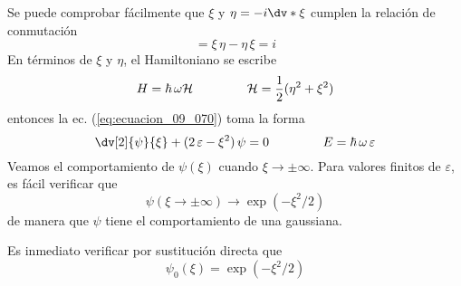 Se puede comprobar fácilmente que $\xi$ y $\eta = - i \dv*{\xi}$ cumplen la relación de conmutación
\begin{equation}
[\xi, \eta] = \xi \, \eta - \eta \, \xi = i
\label{eq:ecuacion_09_072}
\end{equation}
En términos de  $\xi$ y $\eta$, el Hamiltoniano se escribe
\begin{equation}
H =  \hbar \, \omega \mathcal{H} \hspace{1.5cm} \mathcal{H} = \dfrac{1}{2} (\eta^{2} + \xi^{2})
\label{eq:ecuacion_09_073}
\end{equation} 
entonces la ec. (\ref{eq:ecuacion_09_070}) toma la forma
\begin{equation}
\dv[2]{\psi}{\xi} + (2 \, \varepsilon - \xi^{2}) \, \psi = 0 \hspace{1.5cm} E = \hbar \, \omega \, \varepsilon
\label{eq:ecuacion_09_074}
\end{equation}
Veamos el comportamiento de $\psi (\xi)$ cuando $\xi \to \pm \infty$. Para valores finitos de $\varepsilon$, es fácil verificar que
\begin{equation}
\psi (\xi \to \pm \infty) \rightarrow \exp(-\xi^{2}/2)
\label{eq:ecuacion_09_075}
\end{equation}
de manera que $\psi$ tiene el comportamiento de una gaussiana.
\par
Es inmediato verificar por sustitución directa que
\begin{equation}
\psi_{0} (\xi) = \exp(-\xi^{2}/2)
\label{eq:ecuacion_09_076}
\end{equation}
